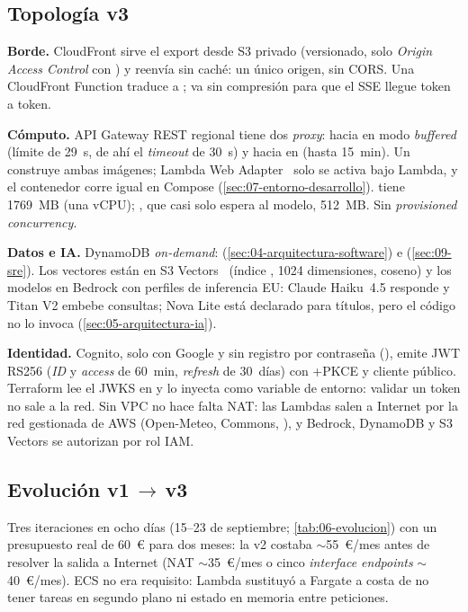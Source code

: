 \subsection{Topología v3}

\textbf{Borde.} CloudFront sirve el export desde S3 privado (versionado, solo \emph{Origin
Access Control} con ) y reenvía  sin caché: un único origen, sin
CORS. Una CloudFront Function traduce
 a ;  va sin compresión para que el SSE llegue token a
token.

\textbf{Cómputo.} API Gateway REST regional tiene dos \emph{proxy}:  hacia
 en modo \emph{buffered} (límite de 29~s, de ahí el \emph{timeout} de 30~s) y
 hacia  en  (hasta 15~min). Un
 construye ambas imágenes; Lambda Web Adapter~\cite{aws:lwa} solo se activa bajo
Lambda, y el contenedor corre igual en Compose (\cref{sec:07-entorno-desarrollo}).  tiene 1769~MB (una vCPU);
, que casi solo espera al modelo, 512~MB. Sin \emph{provisioned concurrency}.

\textbf{Datos e IA.} DynamoDB \emph{on-demand}: 
(\cref{sec:04-arquitectura-software}) e  (\cref{sec:09-sre}). Los
vectores están en S3 Vectors~\cite{aws:s3vectors} (índice , 1024 dimensiones,
coseno) y los modelos en Bedrock con perfiles de inferencia EU: Claude Haiku~4.5 responde y Titan
V2 embebe consultas; Nova Lite está declarado para títulos, pero el código no lo invoca
(\cref{sec:05-arquitectura-ia}).

\textbf{Identidad.} Cognito, solo con Google y sin registro por contraseña
(), emite JWT RS256 (\emph{ID} y \emph{access} de 60~min,
\emph{refresh} de 30~días) con +PKCE y cliente público. Terraform lee el JWKS en  y lo
inyecta como variable de entorno: validar un token no sale a la red. Sin VPC no hace falta NAT:
las Lambdas salen a Internet por la red gestionada de AWS (Open-Meteo, Commons, ),
y Bedrock, DynamoDB y S3 Vectors se autorizan por rol IAM.

\subsection{Evolución v1\,$\rightarrow$\,v3}

Tres iteraciones en ocho días (15--23 de septiembre; \cref{tab:06-evolucion}) con un
presupuesto real de 60~€ para dos meses: la v2 costaba \mbox{$\sim$55}~€/mes antes de resolver
la salida a Internet (NAT \mbox{$\sim$35}~€/mes o cinco \emph{interface endpoints}
\mbox{$\sim$40}~€/mes). ECS no era requisito: Lambda sustituyó a Fargate a costa de no tener tareas en segundo plano
ni estado en memoria entre peticiones.

